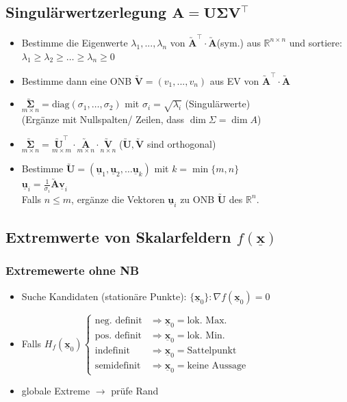 \documentclass[6pt,a4paper]{scrartcl}
\newcommand{\eset}[1]{\ensuremath{\bigl\{#1\bigr\}}}											%
\newcommand{\ma}[1]{\ensuremath{\utilde{\boldsymbol {#1}}}}										%
\renewcommand{\vec}[1]{\ensuremath{\underline{\boldsymbol {#1}}}}								%
\newcommand{\ra}[0]{\ensuremath{\rightarrow}} 									%
\newcommand{\bs}[1]{\ensuremath{\boldsymbol{#1}}}								%
\newcommand{\R}{\ensuremath{\mathbb R}}
\begin{document}
\begin{multicols}{4}
\subsection{Singulärwertzerlegung \quad $\bs A=\bs U \bs\Sigma \bs V^\top$}
\begin{itemize}\itemsep0pt
\item Bestimme die Eigenwerte $\lambda_1, . . . , \lambda_n$ von $\ma A^\top \cdot \ma A$(sym.) aus $\R^{n \times n}$
und sortiere: \\
$\lambda_1 \ge \lambda_2 \ge \ldots \ge \lambda_n \ge 0$ \\
\item Bestimme dann eine ONB $\ma V = (v_1, . . . , v_n)$ aus EV
von $\ma A^\top \cdot \ma A $
\item  $\underset{m \times n}{\ma \Sigma} = \text{diag}(\sigma_1, \ldots, \sigma_2) $ mit $\boxed{\sigma_i = \sqrt{\lambda_i}}$ (Singulärwerte) \\
			(Ergänze mit Nullspalten/ Zeilen, dass $\dim \Sigma = \dim A$)
\item $\underset{m \times n}{\ma \Sigma}  = \underset{m \times m}{\ma U^\top} \cdot \underset{m \times n}{\ma A} \cdot \underset{n \times n}{\ma V}$ \quad ($\ma U, \ma V$ sind orthogonal)\\  %
\item Bestimme $\ma U=(\vec u_1, \vec u_2, \ldots \vec u_k)$ mit $k = \min \eset{m, n}$ \\
$\boxed{\vec u_i =\frac{1}{\sigma_i}\ma A \vec v_i}$ \\
Falls $n \le m$, ergänze die Vektoren $\vec u_i$ zu ONB $\ma U$ des $\R^n$.
\end{itemize}



\subsection{Extremwerte von Skalarfeldern $f(\vec x)$}
\subsubsection{Extremewerte ohne NB} %
\begin{itemize} \itemsep0pt
	\item Suche Kandidaten (stationäre Punkte): $\eset{\vec x_0}:{\nabla f(\vec x_0) = 0}$
	\item Falls $H_f(\vec x_0) \begin{cases} \text{neg. definit} & \Rightarrow \vec x_0 = \text{lok. Max.} \\ \text{pos. definit} & \Rightarrow \vec x_0 = \text{lok. Min.} \\ \text{indefinit} & \Rightarrow \vec x_0 = \text{Sattelpunkt} \\ \text{semidefinit} & \Rightarrow \vec x_0 = \text{keine Aussage} \end{cases}$\\
	\item globale Extreme $\ra $ prüfe Rand
\end{itemize}


\end{multicols}
\end{document}
